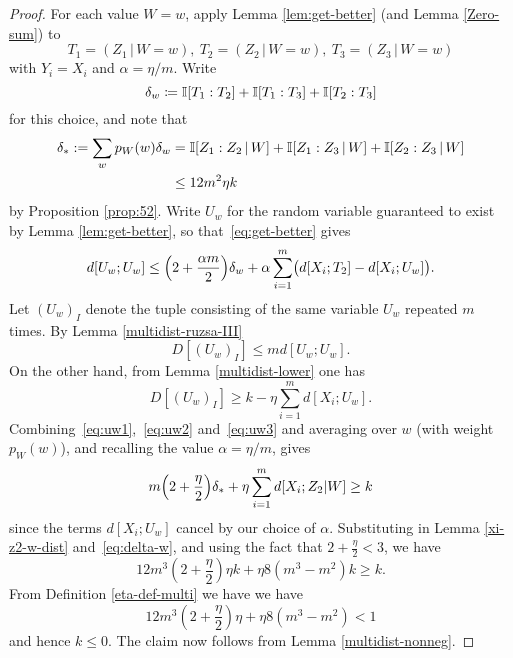 \begin{proof} For each value $W=w$, apply Lemma \ref{lem:get-better} (and Lemma \ref{Zero-sum}) to
  \[
    T_1 = (Z_1 \,|\, W \mathop{=} w),\
    T_2 = (Z_2 \,|\, W \mathop{=} w),\
    T_3 = (Z_3 \,|\, W \mathop{=} w)
  \]
  with $Y_i=X_i$ and $\alpha=\eta/m$.  Write
  \[
    \delta_w \coloneqq \mathbb{I}[T_1 : T_2] + \mathbb{I}[T_1 : T_3] + \mathbb{I}[T_2 : T_3]
  \]
  for this choice, and note that
  \begin{align}
    \label{eq:delta-w}
    \nonumber
    \delta_\ast := \sum_w p_W(w) \delta_w &= \mathbb{I}[Z_1 : Z_2 \,|\, W] + \mathbb{I}[Z_1 : Z_3 \,|\, W] + \mathbb{I}[Z_2 : Z_3 \,|\, W] \\
                           & \leq 12 m^2 \eta k
  \end{align}
  by Proposition \ref{prop:52}.
  Write $U_w$ for the random variable guaranteed to exist by Lemma \ref{lem:get-better},
  so that~\eqref{eq:get-better} gives \begin{equation}
    \label{eq:uw1}
    d[U_w; U_w] \leq \Bigl( 2 + \frac{\alpha m}{2} \Bigr) \delta_w + \alpha \sum_{i=1}^m \bigl( d[X_i; T_2] - d[X_i; U_w] \bigr).
  \end{equation}
  Let $(U_w)_I$ denote the tuple consisting of the same variable $U_w$ repeated $m$ times.
  By Lemma \ref{multidist-ruzsa-III}
  \begin{equation}
    \label{eq:uw2}
    D[(U_w)_I] \leq m d[U_w; U_w].
  \end{equation}
  On the other hand, from Lemma \ref{multidist-lower} one has
  \begin{equation}
    \label{eq:uw3}
    D[(U_w)_I] \geq k - \eta \sum_{i=1}^m d[X_i;U_w].
  \end{equation}
  Combining~\eqref{eq:uw1},~\eqref{eq:uw2} and~\eqref{eq:uw3} and averaging over $w$ (with weight $p_W(w)$), and recalling the value $\alpha=\eta/m$, gives
  \[
     m \Bigl( 2 + \frac{\eta}{2} \Bigr) \delta_\ast + \eta \sum_{i=1}^m d[X_i; Z_2 | W]
    \geq k
  \]
  since the terms $d[X_i; U_w]$ cancel by our choice of $\alpha$.
  Substituting in Lemma \ref{xi-z2-w-dist} and~\eqref{eq:delta-w}, and using the fact that $2 + \frac{\eta}{2} < 3$, we have
  \[
    12 m^3 (2+\frac{\eta}{2}) \eta k + \eta 8(m^3-m^2) k \geq k.
  \]
  From Definition \ref{eta-def-multi} we have we have
  $$ 12 m^3 (2+\frac{\eta}{2}) \eta + \eta 8(m^3-m^2) < 1$$
  and hence $k \leq 0$.  The claim now follows from Lemma \ref{multidist-nonneg}.
\end{proof}

